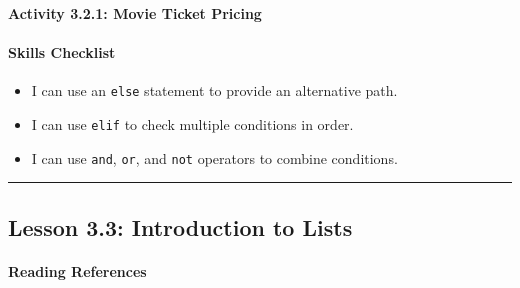 \documentclass[
  justified,
  openright,
]{tufte-book}
\let\subsubsection\paragraph
\let\paragraph\paragraph
\newcommand{\BuiltInTok}[1]{#1}
\newcommand{\ControlFlowTok}[1]{\textcolor{BrandBlue}{#1}}
\newcommand{\DecValTok}[1]{\textcolor{Purple}{#1}}
\newcommand{\NormalTok}[1]{#1}
\newcommand{\OperatorTok}[1]{\textcolor{DarkGray}{#1}}
\newcommand{\StringTok}[1]{\textcolor{Teal}{#1}}
\newenvironment{Shaded}{%
  \begin{snugshade}
}{%
  \end{snugshade}
}
\let\subsubsection\paragraph
\let\paragraph\paragraph
\providecommand{\tightlist}{%
  \setlength{\itemsep}{0pt}\setlength{\parskip}{0pt}}
\begin{document}
\textbf{Activity 3.2.1: Movie Ticket Pricing}

\begin{Shaded}
\end{Shaded}

\subsubsection{Skills Checklist}\label{skills-checklist-13}

\begin{itemize}
\tightlist
\item[$\square$]
  I can use an \texttt{else} statement to provide an alternative path.
\item[$\square$]
  I can use \texttt{elif} to check multiple conditions in order.
\item[$\square$]
  I can use \texttt{and}, \texttt{or}, and \texttt{not} operators to
  combine conditions.
\end{itemize}

\begin{center}\rule{0.5\linewidth}{0.5pt}\end{center}

\subsection{Lesson 3.3: Introduction to
Lists}\label{lesson-3.3-introduction-to-lists}

\subsubsection{Reading References}\label{reading-references-14}
\end{document}
